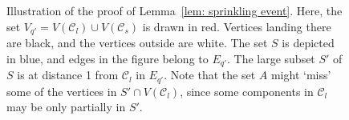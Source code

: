 \documentclass{article}
\theoremstyle{definition}
\newcommand{\cC}{\mathcal{C}}
\begin{document}
\begin{figure}
\caption{Illustration of the proof of Lemma~\ref{lem: sprinkling event}. Here, the set $V_{q'} = V(\cC_l)\cup V(\cC_s)$ is drawn in red. Vertices landing there are black, and the vertices outside are white. 
The set $S$ is depicted in blue, and edges in the figure belong to $E_{q'}$. The large subset $S'$ of $S$ is at distance 1 from $\cC_l$ in $E_{q'}$.
Note that the set $A$ might `miss' some of the vertices in $S'\cap V(\cC_l)$, since some components in $\cC_l$ may be only partially in $S'$.}
\label{fig:5.4}
\end{figure}
\end{document}
